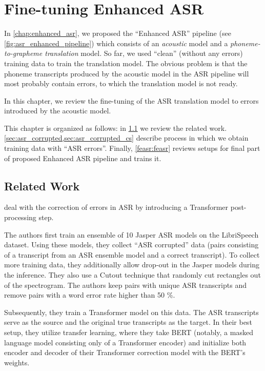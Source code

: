 \chapter{Fine-tuning Enhanced ASR}
\label{chap:fine_tune_enhanced}
In \cref{chap:enhanced_asr}, we proposed the ``Enhanced ASR'' pipeline (see \cref{fig:asr_enhanced_pipeline}) which consists of an \emph{acoustic} model and a \emph{phoneme-to-grapheme translation} model. So far, we used ``clean'' (without any errors) training data to train the translation model. The obvious problem is that the phoneme transcripts produced by the acoustic model in the ASR pipeline will most probably contain errors, to which the translation model is not ready.

In this chapter, we review the fine-tuning of the ASR translation model to errors introduced by the acoustic model.

This chapter is organized as follows: in \cref{feasr:related} we review the related work. \cref{sec:asr_corrupted,sec:asr_corrupted_cs} describe process in which we obtain training data with ``ASR errors''. Finally, \cref{feasr:feasr} reviews setups for final part of proposed Enhanced ASR pipeline and trains it.

\section{Related Work}
\label{feasr:related}

\citet{hrinchuk2019correction} deal with the correction of errors in ASR by introducing a Transformer post-processing step. 

The authors first train an ensemble of 10 Jasper ASR models on the LibriSpeech dataset. Using these models, they collect ``ASR corrupted'' data (pairs consisting of a transcript from an ASR ensemble model and a correct transcript). To collect more training data, they additionally allow drop-out in the Jasper models during the inference. They also use a Cutout  technique that randomly cut rectangles out of the spectrogram. The authors keep pairs with unique ASR transcripts and remove pairs with a word error rate higher than 50 \%. 

Subsequently, they train a Transformer model on this data. The ASR transcripts serve as the source and the original true transcripts as the target. In their best setup, they utilize transfer learning, where they take BERT \citep{devlin2018bert} (notably, a masked language model consisting only of a Transformer encoder) and initialize both encoder and decoder of their Transformer correction model with the BERT's weights.

